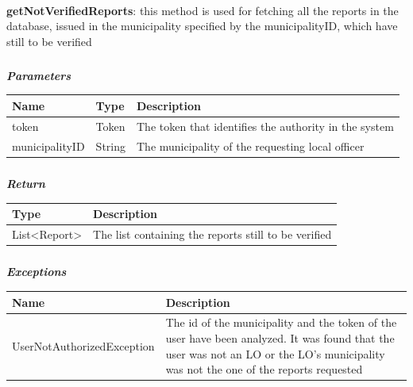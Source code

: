 					\paragraph{}
							\textbf{getNotVerifiedReports}: this method is used for fetching all the reports in the
database, issued in the municipality specified by the municipalityID, which have still to be verified
							\subparagraph{}
							\textit{\textbf{Parameters}}
							\vspace{-2mm}
								\begin{table}[!h]
									\begin{tabular}{L{0.2\textwidth}L{0.15\textwidth}L{0.45\textwidth}}
										\toprule
										\textbf{Name} & \textbf{Type} & \textbf{Description} \\
										\midrule
								  		token & Token & The token that identifies the authority in the system \\
								  		municipalityID & String & The municipality of the requesting local officer \\
								 		\bottomrule
									\end{tabular}
								\end{table}
							\subparagraph{}
							\vspace{-6mm}
								\textit{\textbf{Return}}
								\vspace{-2mm}
									\begin{table}[!h]
									\begin{tabular}{L{0.2\textwidth}L{0.6\textwidth}}
										\toprule
										\textbf{Type} & \textbf{Description} \\
										\midrule
								  		List<Report> & The list containing the reports still to be verified \\
								 		\bottomrule
									\end{tabular}
								\end{table}
							\subparagraph{}
							\vspace{-6mm}
								\textit{\textbf{Exceptions}}
								\vspace{-2mm}
									\begin{table}[!h]
									\begin{tabular}{L{0.4\textwidth}L{0.4\textwidth}}
										\toprule
										\textbf{Name} & \textbf{Description} \\
										\midrule
										UserNotAuthorizedException & The id of the municipality and the token of the user have been analyzed. It was found that the user was not an LO or the LO's municipality was not the one of the reports requested \\
								 		\bottomrule
									\end{tabular}
								\end{table}
								
